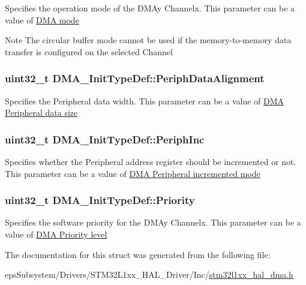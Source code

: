 Specifies the operation mode of the D\-M\-Ay Channelx. This parameter can be a value of \hyperlink{group___d_m_a__mode}{D\-M\-A mode} \begin{DoxyNote}{Note}
The circular buffer mode cannot be used if the memory-\/to-\/memory data transfer is configured on the selected Channel 
\end{DoxyNote}
\hypertarget{struct_d_m_a___init_type_def_a10a4a549953efa20c235dcbb381b6f0b}{
\subsubsection[{Periph\-Data\-Alignment}]{\setlength{\rightskip}{0pt plus 5cm}uint32\-\_\-t D\-M\-A\-\_\-\-Init\-Type\-Def\-::\-Periph\-Data\-Alignment}}\label{struct_d_m_a___init_type_def_a10a4a549953efa20c235dcbb381b6f0b}
Specifies the Peripheral data width. This parameter can be a value of \hyperlink{group___d_m_a___peripheral__data__size}{D\-M\-A Peripheral data size} \hypertarget{struct_d_m_a___init_type_def_a46811eb656170cb5c542054d1a41db3a}{
\subsubsection[{Periph\-Inc}]{\setlength{\rightskip}{0pt plus 5cm}uint32\-\_\-t D\-M\-A\-\_\-\-Init\-Type\-Def\-::\-Periph\-Inc}}\label{struct_d_m_a___init_type_def_a46811eb656170cb5c542054d1a41db3a}
Specifies whether the Peripheral address register should be incremented or not. This parameter can be a value of \hyperlink{group___d_m_a___peripheral__incremented__mode}{D\-M\-A Peripheral incremented mode} \hypertarget{struct_d_m_a___init_type_def_af110cc02c840207930e3c0e5de5d7dc4}{
\subsubsection[{Priority}]{\setlength{\rightskip}{0pt plus 5cm}uint32\-\_\-t D\-M\-A\-\_\-\-Init\-Type\-Def\-::\-Priority}}\label{struct_d_m_a___init_type_def_af110cc02c840207930e3c0e5de5d7dc4}
Specifies the software priority for the D\-M\-Ay Channelx. This parameter can be a value of \hyperlink{group___d_m_a___priority__level}{D\-M\-A Priority level} 

The documentation for this struct was generated from the following file\-:\begin{DoxyCompactItemize}
\item 
eps\-Subsystem/\-Drivers/\-S\-T\-M32\-L1xx\-\_\-\-H\-A\-L\-\_\-\-Driver/\-Inc/\hyperlink{stm32l1xx__hal__dma_8h}{stm32l1xx\-\_\-hal\-\_\-dma.\-h}\end{DoxyCompactItemize}
